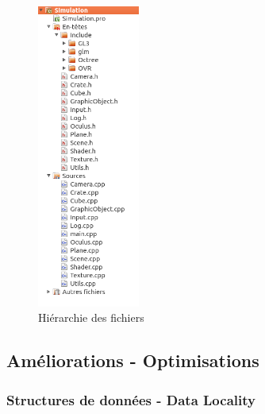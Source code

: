 \documentclass[a4paper,french,12pt]{article}
\begin{document}
	    
	    
	    \begin{figure}
	      \centering
	      \includegraphics[width=0.3\textwidth]{files1.png}
	      \caption{Hiérarchie des fichiers}
	    \end{figure}
	    \FloatBarrier

  \subsection{Améliorations - Optimisations}
  
    \subsubsection{Structures de données - Data Locality}
    
\end{document}
